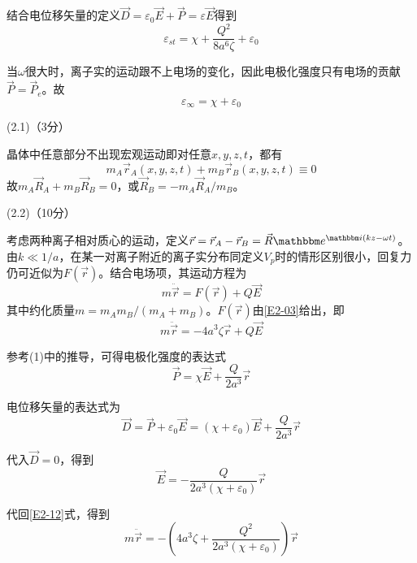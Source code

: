 \documentclass[10pt,a4paper,onecolumn,UTF8]{ctexart}
\begin{document}
	结合电位移矢量的定义$\vec D=\varepsilon_0\vec E+\vec P=\varepsilon\vec E$得到
	\begin{equation}\label{E2-08}
		\varepsilon_{st}=\chi+\frac{Q^2}{8a^6\zeta}+\varepsilon_0
	\end{equation}
	
	当$\omega$很大时，离子实的运动跟不上电场的变化，因此电极化强度只有电场的贡献$\vec P=\vec P_e$。故
	\begin{equation}\label{E2-09}
		\varepsilon_{\infty}=\chi+\varepsilon_0
	\end{equation}
	
	(2.1)（3分）
	
	晶体中任意部分不出现宏观运动即对任意$x,y,z,t$，都有
	\begin{equation}\label{E2-10}
		m_A\vec r_A(x,y,z,t)+m_B\vec r_B(x,y,z,t)\equiv0
	\end{equation}
	故$m_A\vec R_A+m_B\vec R_B=0$，或$\vec R_B=-m_A\vec R_A/m_B$。
	
	(2.2)（10分）
	
	考虑两种离子相对质心的运动，定义$\vec r=\vec r_A-\vec r_B=\vec R\ue^{\ui(kz-\omega t)}$。由$k\ll 1/a$，在某一对离子附近的离子实分布同定义$V_p$时的情形区别很小，回复力仍可近似为$F(\vec r)$。结合电场项，其运动方程为
	\begin{equation}\label{E2-11}
		m\ddot{\vec r}=F(\vec r)+Q\vec E
	\end{equation}
	其中约化质量$m=m_Am_B/(m_A+m_B)$。$F(\vec r)$由\eqref{E2-03}给出，即
	\begin{equation}\label{E2-12}
		m\ddot{\vec r}=-4a^3\zeta\vec r+Q\vec E
	\end{equation}
	
	参考(1)中的推导，可得电极化强度的表达式
	\begin{equation}\label{E2-13}
		\vec P=\chi\vec E+\frac{Q}{2a^3}\vec r
	\end{equation}
	
	电位移矢量的表达式为
	\begin{equation}\label{E2-14}
		\vec D=\vec P+\varepsilon_0\vec E=(\chi+\varepsilon_0)\vec E+\frac{Q}{2a^3}\vec r
	\end{equation}
	
	代入$\vec D=0$，得到
	\begin{equation}\label{E2-15}
		\vec{E}=-\frac{Q}{2a^3(\chi+\varepsilon_0)}\vec r
	\end{equation}
	
	代回\eqref{E2-12}式，得到
	\begin{equation}\label{E2-16}
		m\ddot{\vec r}=-\left(4a^3\zeta+\frac{Q^2}{2a^3(\chi+\varepsilon_0)}\right)\vec r
	\end{equation}
	
\end{document}
